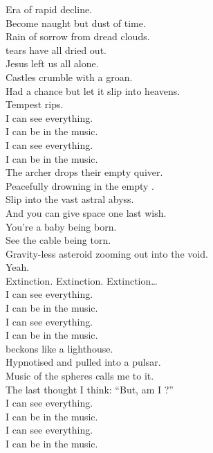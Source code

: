 Era of rapid decline. \\
Become naught but dust of time. \\
Rain of sorrow from dread clouds. \\
 tears have all dried out. \\
Jesus left us all alone. \\
Castles crumble with a groan. \\
Had a chance but let it slip into heavens. \\
Tempest rips. \\

I can see everything. \\
I can be in the music. \\
I can see everything. \\
I can be in the music. \\

The archer drops their empty quiver. \\
Peacefully drowning in the empty . \\
Slip into the vast astral abyss. \\
And you can give space one last wish. \\

You're a baby being born. \\
See the cable being torn. \\
Gravity-less asteroid zooming out into the void. \\
Yeah. \\

Extinction. Extinction. Extinction… \\

I can see everything. \\
I can be in the music. \\
I can see everything. \\
I can be in the music. \\

 beckons like a lighthouse. \\
Hypnotised and pulled into a pulsar. \\
Music of the spheres calls me to it. \\
The last thought I think: ``But, am I ?'' \\

I can see everything. \\
I can be in the music. \\
I can see everything. \\
I can be in the music. \\

